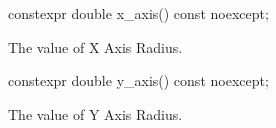 \begin{itemdecl}
constexpr double x_axis() const noexcept;
\end{itemdecl}
\begin{itemdescr}
\pnum
\returns
The value of X Axis Radius.
\end{itemdescr}

\begin{itemdecl}
constexpr double y_axis() const noexcept;
\end{itemdecl}
\begin{itemdescr}
\pnum
\returns
The value of Y Axis Radius.
\end{itemdescr}
